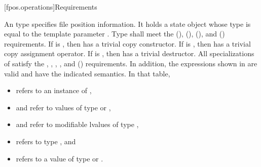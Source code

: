 [fpos.operations]{Requirements}

\pnum
{}%
%
An  type specifies file position information.
It holds a state object
whose type is equal to the template parameter .
Type  shall meet
the  (),
 (),
 (), and
 () requirements.
If  is ,
then  has a trivial copy constructor.
If  is ,
then  has a trivial copy assignment operator.
If  is ,
then  has a trivial destructor.
All specializations of  satisfy
the ,
,
,
,
and  () requirements.
In addition, the expressions shown in 
are valid and have the indicated semantics.
In that table,
\begin{itemize}
\item {} refers to an instance of ,
\item {} and  refer to values
of type  or ,
\item {} and  refer to modifiable lvalues of type ,
\item {} refers to type , and
\item {} refers to a value
of type  or .
\end{itemize}

